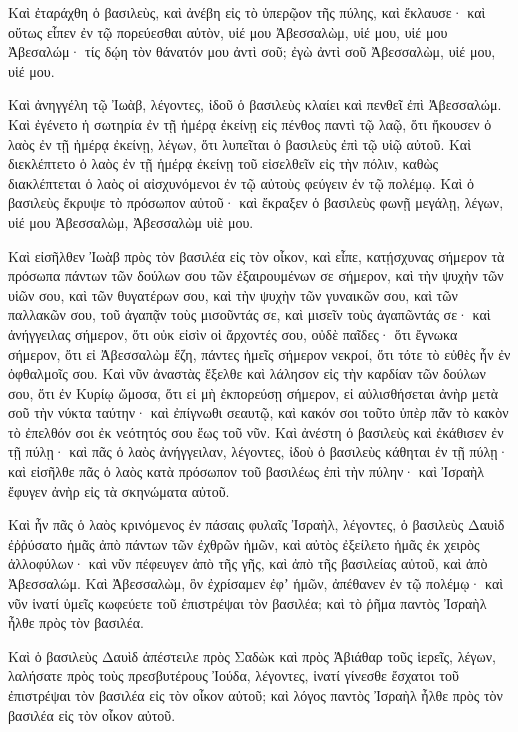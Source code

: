{Καὶ ἐταράχθη ὁ βασιλεὺς, καὶ ἀνέβη εἰς τὸ ὑπερῷον τῆς πύλης, καὶ ἔκλαυσε· καὶ οὕτως εἶπεν ἐν τῷ πορεύεσθαι αὐτὸν, υἱέ μου Ἀβεσσαλὼμ, υἱέ μου, υἱέ μου Ἀβεσαλώμ· τίς δῴη τὸν θάνατόν μου ἀντὶ σοῦ; ἐγὼ ἀντὶ σοῦ Ἀβεσσαλὼμ, υἱέ μου, υἱέ μου.
\par }{\PP {}Καὶ ἀνηγγέλη τῷ Ἰωὰβ, λέγοντες, ἰδοῦ ὁ βασιλεὺς κλαίει καὶ πενθεῖ ἐπὶ Ἀβεσσαλώμ.
Καὶ ἐγένετο ἡ σωτηρία ἐν τῇ ἡμέρᾳ ἐκείνῃ εἰς πένθος παντὶ τῷ λαῷ, ὅτι ἤκουσεν ὁ λαὸς ἐν τῇ ἡμέρᾳ ἐκείνῃ, λέγων, ὅτι λυπεῖται ὁ βασιλεὺς ἐπὶ τῷ υἱῷ αὐτοῦ.
Καὶ διεκλέπτετο ὁ λαὸς ἐν τῇ ἡμέρᾳ ἐκείνῃ τοῦ εἰσελθεῖν εἰς τὴν πόλιν, καθὼς διακλέπτεται ὁ λαὸς οἱ αἰσχυνόμενοι ἐν τῷ αὐτοὺς φεύγειν ἐν τῷ πολέμῳ.
Καὶ ὁ βασιλεὺς ἔκρυψε τὸ πρόσωπον αὐτοῦ· καὶ ἔκραξεν ὁ βασιλεὺς φωνῇ μεγάλῃ, λέγων, υἱέ μου Ἀβεσσαλὼμ, Ἀβεσσαλὼμ υἱὲ μου.
\par }{\PP {}Καὶ εἰσῆλθεν Ἰωὰβ πρὸς τὸν βασιλέα εἰς τὸν οἶκον, καὶ εἶπε, κατῄσχυνας σήμερον τὰ πρόσωπα πάντων τῶν δούλων σου τῶν ἐξαιρουμένων σε σήμερον, καὶ τὴν ψυχὴν τῶν υἱῶν σου, καὶ τῶν θυγατέρων σου, καὶ τὴν ψυχὴν τῶν γυναικῶν σου, καὶ τῶν παλλακῶν σου,
τοῦ ἀγαπᾷν τοὺς μισοῦντάς σε, καὶ μισεῖν τοὺς ἀγαπῶντάς σε· καὶ ἀνήγγειλας σήμερον, ὅτι οὐκ εἰσὶν οἱ ἄρχοντές σου, οὐδὲ παῖδες· ὅτι ἔγνωκα σήμερον, ὅτι εἰ Ἀβεσσαλὼμ ἔζη, πάντες ἡμεῖς σήμερον νεκροί, ὅτι τότε τὸ εὐθὲς ἦν ἐν ὀφθαλμοῖς σου.
Καὶ νῦν ἀναστὰς ἔξελθε καὶ λάλησον εἰς τὴν καρδίαν τῶν δούλων σου, ὅτι ἐν Κυρίῳ ὤμοσα, ὅτι εἰ μὴ ἐκπορεύσῃ σήμερον, εἰ αὐλισθήσεται ἀνὴρ μετὰ σοῦ τὴν νύκτα ταύτην· καὶ ἐπίγνωθι σεαυτῷ, καὶ κακόν σοι τοῦτο ὑπὲρ πᾶν τὸ κακὸν τὸ ἐπελθόν σοι ἐκ νεότητός σου ἕως τοῦ νῦν.
Καὶ ἀνέστη ὁ βασιλεὺς καὶ ἐκάθισεν ἐν τῇ πύλῃ· καὶ πᾶς ὁ λαὸς ἀνήγγειλαν, λέγοντες, ἰδοὺ ὁ βασιλεὺς κάθηται ἐν τῇ πύλῃ· καὶ εἰσῆλθε πᾶς ὁ λαὸς κατὰ πρόσωπον τοῦ βασιλέως ἐπὶ τὴν πύλην· καὶ Ἰσραὴλ ἔφυγεν ἀνὴρ εἰς τὰ σκηνώματα αὐτοῦ.
\par }{\PP {}Καὶ ἦν πᾶς ὁ λαὸς κρινόμενος ἐν πάσαις φυλαῖς Ἰσραὴλ, λέγοντες, ὁ βασιλεὺς Δαυὶδ ἐῤῥύσατο ἡμᾶς ἀπὸ πάντων τῶν ἐχθρῶν ἡμῶν, καὶ αὐτὸς ἐξείλετο ἡμᾶς ἐκ χειρὸς ἀλλοφύλων· καὶ νῦν πέφευγεν ἀπὸ τῆς γῆς, καὶ ἀπὸ τῆς βασιλείας αὐτοῦ, καὶ ἀπὸ Ἀβεσσαλώμ.
Καὶ Ἀβεσσαλὼμ, ὃν ἐχρίσαμεν ἐφʼ ἡμῶν, ἀπέθανεν ἐν τῷ πολέμῳ· καὶ νῦν ἱνατί ὑμεῖς κωφεύετε τοῦ ἐπιστρέψαι τὸν βασιλέα; καὶ τὸ ῥῆμα παντὸς Ἰσραὴλ ἦλθε πρὸς τὸν βασιλέα.
\par }{\PP {}Καὶ ὁ βασιλεὺς Δαυὶδ ἀπέστειλε πρὸς Σαδὼκ καὶ πρὸς Ἀβιάθαρ τοῦς ἱερεῖς, λέγων, λαλήσατε πρὸς τοὺς πρεσβυτέρους Ἰούδα, λέγοντες, ἱνατί γίνεσθε ἔσχατοι τοῦ ἐπιστρέψαι τὸν βασιλέα εἰς τὸν οἶκον αὐτοῦ; καὶ λόγος παντὸς Ἰσραὴλ ἦλθε πρὸς τὸν βασιλέα εἰς τὸν οἶκον αὐτοῦ.
}
